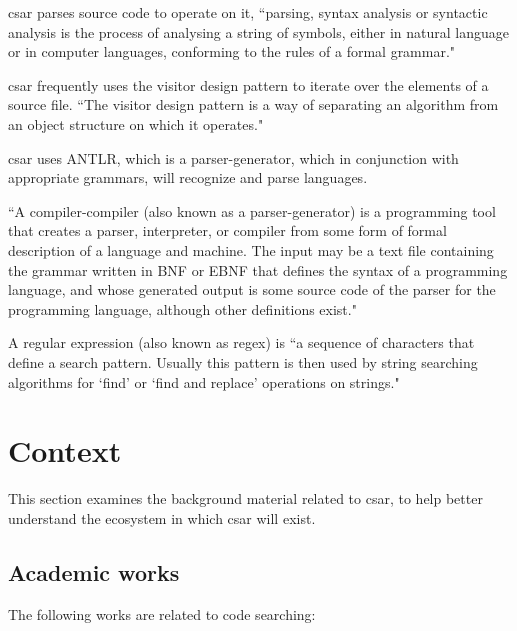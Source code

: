 \documentclass[12pt, letterpaper]{article}
\begin{document}
csar parses source code to operate on it, ``parsing, syntax analysis or syntactic analysis is the process of analysing a string of symbols, either in natural language or in computer languages, conforming to the rules of a formal grammar." \autocite{wikipediaparsing}

csar frequently uses the visitor design pattern to iterate over the elements of a source file.
``The visitor design pattern is a way of separating an algorithm from an object structure on which it operates." \autocite{wikipediavisitorpattern}

csar uses ANTLR, which is a parser-generator, which in conjunction with appropriate grammars, will recognize and parse languages.

``A compiler-compiler (also known as a parser-generator) is a programming tool that creates a parser, interpreter, or compiler from some form of formal description of a language and machine. The input may be a text file containing the grammar written in BNF or EBNF that defines the syntax of a programming language, and whose generated output is some source code of the parser for the programming language, although other definitions exist." \autocite{wikipediacompilercompiler}

A regular expression (also known as regex) is ``a sequence of characters that define a search pattern. Usually this pattern is then used by string searching algorithms for `find' or `find and replace' operations on strings." \autocite{wikipediaregex}

\section{Context}
This section examines the background material related to csar, to help better understand the ecosystem in which csar will exist.

\subsection{Academic works}
The following works are related to code searching:
\end{document}
